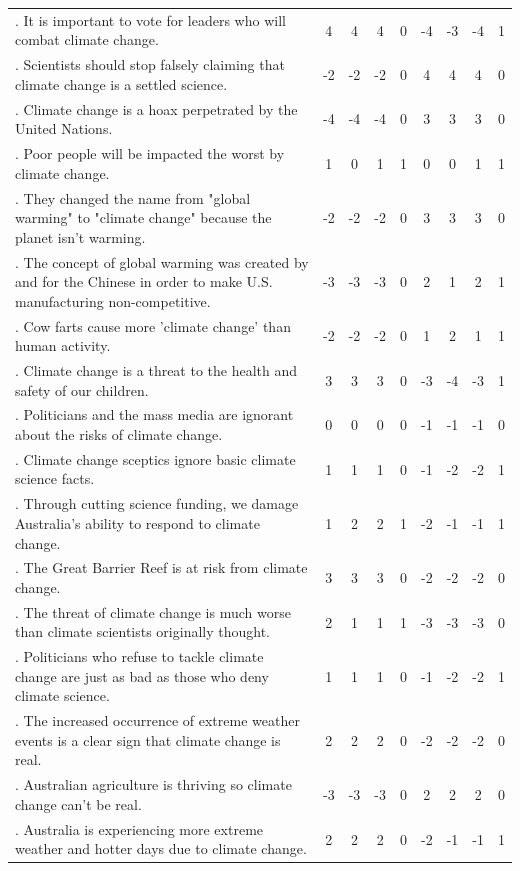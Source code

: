 \documentclass[
  letterpaper,
  DIV=11,
  numbers=noendperiod]{scrartcl}
\begin{document}
\begin{longtable}[t]{>{\raggedright\arraybackslash}p{12em}cccccccc}
\endfoot
\bottomrule
\endlastfoot
1. It is important to vote for leaders who will combat climate change. & 4 & 4 & 4 & 0 & -4 & -3 & -4 & 1\\
2. Scientists should stop falsely claiming that climate change is a settled science. & -2 & -2 & -2 & 0 & 4 & 4 & 4 & 0\\
3. Climate change is a hoax perpetrated by the United Nations. & -4 & -4 & -4 & 0 & 3 & 3 & 3 & 0\\
4. Poor people will be impacted the worst by climate change. & 1 & 0 & 1 & 1 & 0 & 0 & 1 & 1\\
5. They changed the name from "global warming" to "climate change" because the planet isn't warming. & -2 & -2 & -2 & 0 & 3 & 3 & 3 & 0\\
6. The concept of global warming was created by and for the Chinese in order to make U.S. manufacturing non-competitive. & -3 & -3 & -3 & 0 & 2 & 1 & 2 & 1\\
7. Cow farts cause more 'climate change' than human activity. & -2 & -2 & -2 & 0 & 1 & 2 & 1 & 1\\
8. Climate change is a threat to the health and safety of our children. & 3 & 3 & 3 & 0 & -3 & -4 & -3 & 1\\
9. Politicians and the mass media are ignorant about the risks of climate change. & 0 & 0 & 0 & 0 & -1 & -1 & -1 & 0\\
10. Climate change sceptics ignore basic climate science facts. & 1 & 1 & 1 & 0 & -1 & -2 & -2 & 1\\
11. Through cutting science funding, we damage Australia's ability to respond to climate change. & 1 & 2 & 2 & 1 & -2 & -1 & -1 & 1\\
12. The Great Barrier Reef is at risk from climate change. & 3 & 3 & 3 & 0 & -2 & -2 & -2 & 0\\
13. The threat of climate change is much worse than climate scientists originally thought. & 2 & 1 & 1 & 1 & -3 & -3 & -3 & 0\\
14. Politicians who refuse to tackle climate change are just as bad as those who deny climate science. & 1 & 1 & 1 & 0 & -1 & -2 & -2 & 1\\
15. The increased occurrence of extreme weather events is a clear sign that climate change is real. & 2 & 2 & 2 & 0 & -2 & -2 & -2 & 0\\
16. Australian agriculture is thriving so climate change can't be real. & -3 & -3 & -3 & 0 & 2 & 2 & 2 & 0\\
17. Australia is experiencing more extreme weather and hotter days due to climate change. & 2 & 2 & 2 & 0 & -2 & -1 & -1 & 1\\

\end{longtable}
\end{document}
